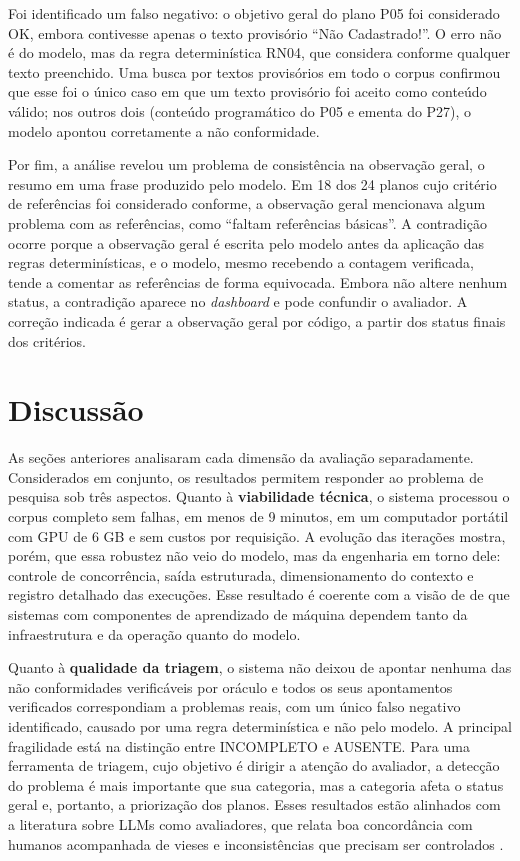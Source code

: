 Foi identificado um falso negativo: o objetivo geral do plano P05 foi considerado OK, embora contivesse apenas o texto provisório ``Não Cadastrado!''. O erro não é do modelo, mas da regra determinística RN04, que considera conforme qualquer texto preenchido. Uma busca por textos provisórios em todo o corpus confirmou que esse foi o único caso em que um texto provisório foi aceito como conteúdo válido; nos outros dois (conteúdo programático do P05 e ementa do P27), o modelo apontou corretamente a não conformidade.

Por fim, a análise revelou um problema de consistência na observação geral, o resumo em uma frase produzido pelo modelo. Em 18 dos 24 planos cujo critério de referências foi considerado conforme, a observação geral mencionava algum problema com as referências, como ``faltam referências básicas''. A contradição ocorre porque a observação geral é escrita pelo modelo antes da aplicação das regras determinísticas, e o modelo, mesmo recebendo a contagem verificada, tende a comentar as referências de forma equivocada. Embora não altere nenhum status, a contradição aparece no \textit{dashboard} e pode confundir o avaliador. A correção indicada é gerar a observação geral por código, a partir dos status finais dos critérios.

\section{Discussão}
\label{sec:res-discussao}

As seções anteriores analisaram cada dimensão da avaliação separadamente. Considerados em conjunto, os resultados permitem responder ao problema de pesquisa sob três aspectos. Quanto à \textbf{viabilidade técnica}, o sistema processou o corpus completo sem falhas, em menos de 9 minutos, em um computador portátil com GPU de 6 GB e sem custos por requisição. A evolução das iterações mostra, porém, que essa robustez não veio do modelo, mas da engenharia em torno dele: controle de concorrência, saída estruturada, dimensionamento do contexto e registro detalhado das execuções. Esse resultado é coerente com a visão de  de que sistemas com componentes de aprendizado de máquina dependem tanto da infraestrutura e da operação quanto do modelo.

Quanto à \textbf{qualidade da triagem}, o sistema não deixou de apontar nenhuma das não conformidades verificáveis por oráculo e todos os seus apontamentos verificados correspondiam a problemas reais, com um único falso negativo identificado, causado por uma regra determinística e não pelo modelo. A principal fragilidade está na distinção entre INCOMPLETO e AUSENTE. Para uma ferramenta de triagem, cujo objetivo é dirigir a atenção do avaliador, a detecção do problema é mais importante que sua categoria, mas a categoria afeta o status geral e, portanto, a priorização dos planos. Esses resultados estão alinhados com a literatura sobre LLMs como avaliadores, que relata boa concordância com humanos acompanhada de vieses e inconsistências que precisam ser controlados \cite{Zheng2023, Chang2024}.

